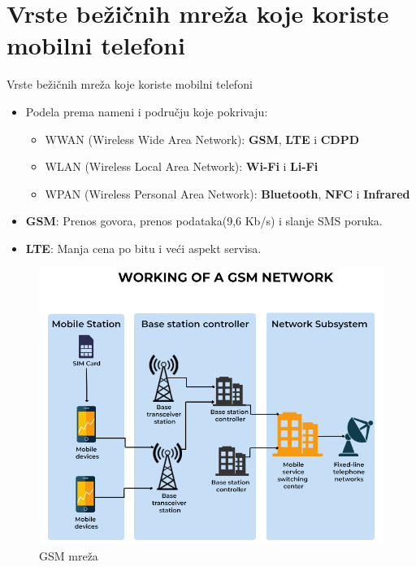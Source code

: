 \documentclass{beamer}
\begin{document}
\section{Vrste bežičnih mreža koje koriste mobilni telefoni}
\begin{frame}{Vrste bežičnih mreža koje koriste mobilni telefoni}
\begin{itemize}
\item Podela prema nameni i području koje pokrivaju:
\begin{itemize}
    \item WWAN (Wireless Wide Area Network): \textbf{GSM}, \textbf{LTE} i \textbf{CDPD}
    \item WLAN (Wireless Local Area Network): \textbf{Wi-Fi} i \textbf{Li-Fi}
    \item WPAN (Wireless Personal Area Network): \textbf{Bluetooth}, \textbf{NFC} i \textbf{Infrared}
\end{itemize}
\item \textbf{GSM}: Prenos govora, prenos podataka(9,6 Kb/s) i slanje SMS poruka.
\item \textbf{LTE}: Manja cena po bitu i veći aspekt servisa.
\end{itemize}

\begin{figure}[!ht]
\begin{center}
\includegraphics[scale=0.15]{GSM.png}
\end{center}
\caption{GSM mreža}
\label{fig:GSM}
\end{figure}
    
\end{frame} 
\end{document}
